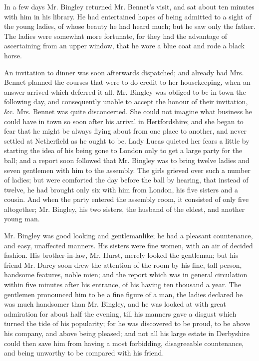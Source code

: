 In a few days Mr. Bingley returned Mr. Bennet’s visit,
and sat about ten minutes with him in his library. He
had entertained hopes of being admitted to a sight of the
young ladies, of whose beauty he had heard much; but
he saw only the father. The ladies were somewhat more
fortunate, for they had the advantage of ascertaining from
an upper window, that he wore a blue coat and rode a black
horse.

An invitation to dinner was soon afterwards dispatched;
and already had Mrs. Bennet planned the courses that were
to do credit to her housekeeping, when an answer arrived
which deferred it all. Mr. Bingley was obliged to be in
town the following day, and consequently unable to accept
the honour of their invitation, \&c. Mrs. Bennet was
quite disconcerted. She could not imagine what business
he could have in town so soon after his arrival in
Hertfordshire; and she began to fear that he might be always
flying about from one place to another, and never settled
at Netherfield as he ought to be. Lady Lucas quieted her
fears a little by starting the idea of his being gone to
London only to get a large party for the ball; and a report
soon followed that Mr. Bingley was to bring twelve ladies
and seven gentlemen with him to the assembly. The girls
grieved over such a number of ladies; but were comforted
the day before the ball by hearing, that instead of twelve,
he had brought only six with him from London, his five
sisters and a cousin. And when the party entered the
assembly room, it consisted of only five altogether;
Mr. Bingley, his two sisters, the husband of the eldest,
and another young man.

Mr. Bingley was good looking and gentlemanlike; he
had a pleasant countenance, and easy, unaffected manners.
His sisters were fine women, with an air of decided fashion.
His brother-in-law, Mr. Hurst, merely looked the gentleman;
but his friend Mr. Darcy soon drew the attention
of the room by his fine, tall person, handsome features,
noble mien; and the report which was in general circulation
within five minutes after his entrance, of his having
ten thousand a year. The gentlemen pronounced him to
be a fine figure of a man, the ladies declared he was much
handsomer than Mr. Bingley, and he was looked at with
great admiration for about half the evening, till his
manners gave a disgust which turned the tide of his
popularity; for he was discovered to be proud, to be
above his company, and above being pleased; and not
all his large estate in Derbyshire could then save him from
having a most forbidding, disagreeable countenance, and
being unworthy to be compared with his friend.

